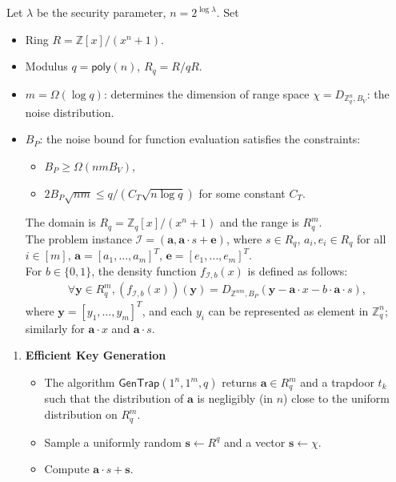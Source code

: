 \begin{defn} Let $\lambda$ be the security parameter, $n=2^{\log \lambda}$. Set
\begin{itemize}
    \item Ring $R=\mathbb{Z}[x]/(x^n+1)$.
    \item Modulus $q=\mathsf{poly}(n)$, $R_q=R/qR$.
    \item $m=\Omega(\log q)$: determines the dimension of range space
    $\chi = D_{\mathbb{Z}^n_q,B_V}$: the noise distribution.
    \item $B_P$: the noise bound for function evaluation satisfies the constraints:
    \begin{itemize}
        \item $B_P\geq \Omega(nmB_V)$,
        \item $2B_P\sqrt{nm}\leq q/(C_T\sqrt{n\log q})$ for some constant $C_T$.
    \end{itemize}
    The domain is $R_q=\mathbb{Z}_q[x]/(x^n+1)$ and the range is $R_q^{m}$.\\
    The problem instance $\mathcal{I}=(\mathbf{a},\mathbf{a}\cdot s+\mathbf{e})$, where $s\in R_q$, $a_i,e_i\in R_q$ for all $i\in[m]$, $\mathbf{a}=[a_1,\dots,a_m]^T$, $\mathbf{e}=[e_1,\dots,e_m]^T$.\\
    For $b\in\{0,1\}$, the density function $f_{\mathcal{I},b}(x)$ is defined as follows:
    \begin{align}
        \forall \mathbf{y}\in R_q^m, (f_{\mathcal{I},b}(x))(\mathbf{y})=D_{\mathbb{Z}^{nm},B_P}(\mathbf{y}-\mathbf{a}\cdot x - b\cdot \mathbf{a}\cdot s),
    \end{align}
    where $\mathbf{y}=[y_1,\dots,y_m]^T$, and each $y_i$ can be represented as element in $\mathbb{Z}^n_q$; similarly for $\mathbf{a}\cdot x$ and $\mathbf{a}\cdot s$.
\end{itemize}
\begin{enumerate}
    \item \textbf{Efficient Key Generation} 
        \begin{itemize}
            \item The algorithm $\mathsf{GenTrap}(1^n,1^m,q)$ returns $\mathbf{a}\in R^m_q$ and a trapdoor $t_{k}$ such that the distribution of $\mathbf{a}$ is negligibly (in $n$) close to the uniform distribution on $R^m_q$.
        \item Sample a uniformly random $\mathbf{s}\gets R^q$ and a vector $\mathbf{s}\gets \chi$.
        \item Compute $\mathbf{a}\cdot s+\mathbf{s}$.

\end{itemize}
\end{enumerate}
\end{defn}
